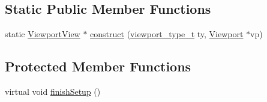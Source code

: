 \subsection*{Static Public Member Functions}
\begin{DoxyCompactItemize}
\item 
static \hyperlink{classShipCAD_1_1ViewportView}{Viewport\+View} $\ast$ \hyperlink{classShipCAD_1_1ViewportView_aec2ef49c2d2ecf9099dfbf32cd645144}{construct} (\hyperlink{namespaceShipCAD_aeeeb05810f2e31ef89fd4ac6b6ba9c0a}{viewport\+\_\+type\+\_\+t} ty, \hyperlink{classShipCAD_1_1Viewport}{Viewport} $\ast$vp)
\end{DoxyCompactItemize}
\subsection*{Protected Member Functions}
\begin{DoxyCompactItemize}
\item 
virtual void \hyperlink{classShipCAD_1_1ViewportView_a15b8dab8f55b9967feeb7b93c234053d}{finish\+Setup} ()
\end{DoxyCompactItemize}
